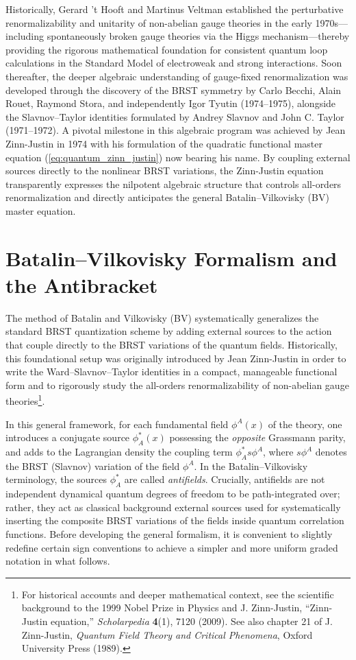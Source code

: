 Historically, Gerard 't Hooft and Martinus Veltman established the perturbative renormalizability and unitarity of non-abelian gauge theories in the early 1970s—including spontaneously broken gauge theories via the Higgs mechanism—thereby providing the rigorous mathematical foundation for consistent quantum loop calculations in the Standard Model of electroweak and strong interactions. Soon thereafter, the deeper algebraic understanding of gauge-fixed renormalization was developed through the discovery of the BRST symmetry by Carlo Becchi, Alain Rouet, Raymond Stora, and independently Igor Tyutin (1974--1975), alongside the Slavnov--Taylor identities formulated by Andrey Slavnov and John C. Taylor (1971--1972). A pivotal milestone in this algebraic program was achieved by Jean Zinn-Justin in 1974 with his formulation of the quadratic functional master equation (\ref{eq:quantum_zinn_justin}) now bearing his name. By coupling external sources directly to the nonlinear BRST variations, the Zinn-Justin equation transparently expresses the nilpotent algebraic structure that controls all-orders renormalization and directly anticipates the general Batalin--Vilkovisky (BV) master equation.

\section{Batalin--Vilkovisky Formalism and the Antibracket}

The method of Batalin and Vilkovisky (BV) systematically generalizes the standard BRST quantization scheme by adding external sources to the action that couple directly to the BRST variations of the quantum fields. Historically, this foundational setup was originally introduced by Jean Zinn-Justin in order to write the Ward--Slavnov--Taylor identities in a compact, manageable functional form and to rigorously study the all-orders renormalizability of non-abelian gauge theories\footnote{For historical accounts and deeper mathematical context, see the scientific background to the 1999 Nobel Prize in Physics and J. Zinn-Justin, ``Zinn-Justin equation,'' \textit{Scholarpedia} \textbf{4}(1), 7120 (2009). See also chapter 21 of J. Zinn-Justin, \textit{Quantum Field Theory and Critical Phenomena}, Oxford University Press (1989).}.

In this general framework, for each fundamental field \(\phi^A(x)\) of the theory, one introduces a conjugate source \(\phi_A^*(x)\) possessing the \textit{opposite} Grassmann parity, and adds to the Lagrangian density the coupling term \(\phi_A^* s\phi^A\), where \(s\phi^A\) denotes the BRST (Slavnov) variation of the field \(\phi^A\). In the Batalin--Vilkovisky terminology, the sources \(\phi_A^*\) are called \textit{antifields}. Crucially, antifields are not independent dynamical quantum degrees of freedom to be path-integrated over; rather, they act as classical background external sources used for systematically inserting the composite BRST variations of the fields inside quantum correlation functions. Before developing the general formalism, it is convenient to slightly redefine certain sign conventions to achieve a simpler and more uniform graded notation in what follows.

